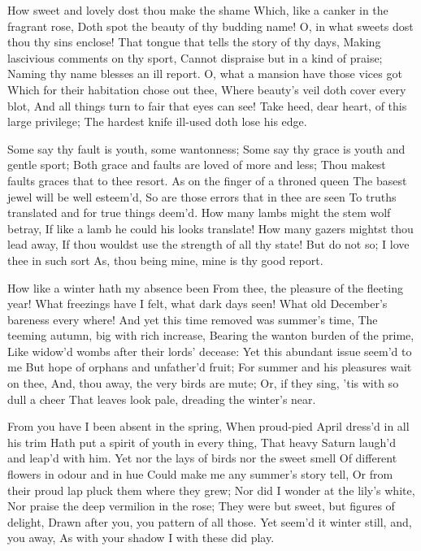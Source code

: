 \documentclass[twocolumn]{book}
\begin{document}
How sweet and lovely dost thou make the shame
Which, like a canker in the fragrant rose,
Doth spot the beauty of thy budding name!
O, in what sweets dost thou thy sins enclose!
That tongue that tells the story of thy days,
Making lascivious comments on thy sport,
Cannot dispraise but in a kind of praise;
Naming thy name blesses an ill report.
O, what a mansion have those vices got
\numerus*{}Which for their habitation chose out thee,
Where beauty's veil doth cover every blot,
And all things turn to fair that eyes can see!
  Take heed, dear heart, of this large privilege;
  The hardest knife ill-used doth lose his edge.


Some say thy fault is youth, some wantonness;
Some say thy grace is youth and gentle sport;
Both grace and faults are loved of more and less;
Thou makest faults graces that to thee resort.
As on the finger of a throned queen
The basest jewel will be well esteem'd,
So are those errors that in thee are seen
To truths translated and for true things deem'd.
How many lambs might the stem wolf betray,
\numerus*{}If like a lamb he could his looks translate!
How many gazers mightst thou lead away,
If thou wouldst use the strength of all thy state!
  But do not so; I love thee in such sort
  As, thou being mine, mine is thy good report.


How like a winter hath my absence been
From thee, the pleasure of the fleeting year!
What freezings have I felt, what dark days seen!
What old December's bareness every where!
And yet this time removed was summer's time,
The teeming autumn, big with rich increase,
Bearing the wanton burden of the prime,
Like widow'd wombs after their lords' decease:
Yet this abundant issue seem'd to me
But hope of orphans and unfather'd fruit;
For summer and his pleasures wait on thee,
And, thou away, the very birds are mute;
  Or, if they sing, 'tis with so dull a cheer
  That leaves look pale, dreading the winter's near.


From you have I been absent in the spring,
When proud-pied April dress'd in all his trim
Hath put a spirit of youth in every thing,
That heavy Saturn laugh'd and leap'd with him.
\numerus*{}Yet nor the lays of birds nor the sweet smell
Of different flowers in odour and in hue
Could make me any summer's story tell,
Or from their proud lap pluck them where they grew;
Nor did I wonder at the lily's white,
Nor praise the deep vermilion in the rose;
They were but sweet, but figures of delight,
Drawn after you, you pattern of all those.
  Yet seem'd it winter still, and, you away,
  As with your shadow I with these did play.
\end{document}
